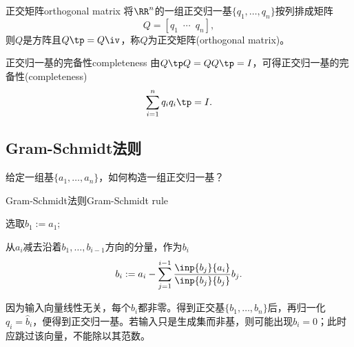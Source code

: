 \begin{definition}
	{正交矩阵}{orthogonal matrix}
	将$\RR^n$的一组正交归一基$\{q_1,\ldots,q_n\}$按列排成矩阵
	\[
		Q=[q_1\enspace\cdots\enspace q_n],
	\]
	则$Q$是方阵且$Q\tp=Q\iv$，称$Q$为正交矩阵(orthogonal matrix)。
\end{definition}
\begin{theorem}
	{正交归一基的完备性}{completeness}
	由$Q\tp Q=QQ\tp=I$，可得正交归一基的完备性(completeness)
	\begin{equation}
		\sum_{i=1}^nq_iq_i\tp=I.
	\end{equation}
\end{theorem}

\subsection{Gram-Schmidt法则}

给定一组基$\{a_1,\ldots,a_n\}$，如何构造一组正交归一基？

\begin{method}{Gram-Schmidt法则}{Gram-Schmidt rule}
	\begin{compactenum}
		\item 选取$b_1:=a_1;$
		\item 从$a_i$减去沿着$b_1,\ldots,b_{i-1}$方向的分量，作为$b_i$
		\[
			b_i:=a_i-\sum_{j=1}^{i-1}\frac{\inp{b_j}{a_i}}{\inp{b_j}{b_j}}b_j.
		\]
	\end{compactenum}
	因为输入向量线性无关，每个$b_i$都非零。得到正交基$\{b_1,\ldots,b_n\}$后，再归一化$q_i=\hat b_i$，便得到正交归一基。若输入只是生成集而非基，则可能出现$b_i=0$；此时应跳过该向量，不能除以其范数。
\end{method}

